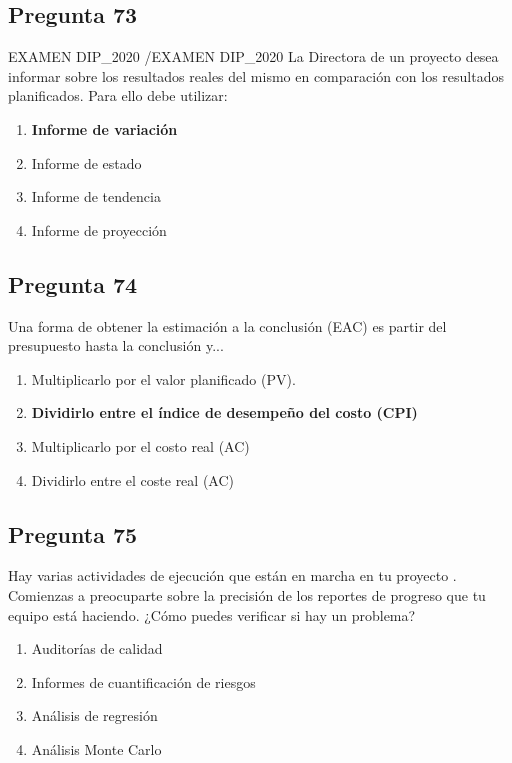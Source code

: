 \documentclass[11pt,a4paper]{article}
\begin{document}
\subsection*{Pregunta 73}
EXAMEN DIP\_2020 /EXAMEN DIP\_2020 La Directora de un proyecto desea informar sobre los resultados reales del mismo en comparación con los resultados planificados. Para ello debe utilizar:

\begin{enumerate}[label=\alph*)]
  \item \textbf{Informe de variación}
  \item Informe de estado
  \item Informe de tendencia
  \item Informe de proyección
\end{enumerate}

\subsection*{Pregunta 74}
Una forma de obtener la estimación a la conclusión (EAC) es partir del presupuesto hasta la conclusión y...

\begin{enumerate}[label=\alph*)]
  \item Multiplicarlo por el valor planificado (PV).
  \item \textbf{Dividirlo entre el índice de desempeño del costo (CPI)}
  \item Multiplicarlo por el costo real (AC)
  \item Dividirlo entre el coste real (AC)
\end{enumerate}

\subsection*{Pregunta 75}
Hay varias actividades de ejecución que están en marcha en tu proyecto . Comienzas a preocuparte sobre la precisión de los reportes de progreso que tu equipo está haciendo. ¿Cómo puedes verificar si hay un problema?

\begin{enumerate}[label=\alph*)]
  \item Auditorías de calidad
  \item Informes de cuantificación de riesgos
  \item Análisis de regresión
  \item Análisis Monte Carlo
\end{enumerate}
\end{document}
